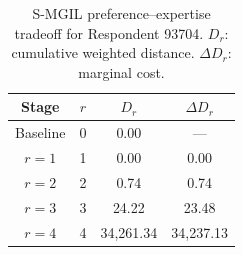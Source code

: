 \begin{table}[htbp]
\centering
\caption{S-MGIL preference--expertise tradeoff for Respondent 93704. $D_r$: cumulative weighted distance. $\Delta D_r$: marginal cost.}
\label{tab:tradeoff}
\footnotesize
\begin{tabular}{cccc}
\toprule
Stage & $r$ & $D_r$ & $\Delta D_r$ \\
\midrule
Baseline & 0 & 0.00 & --- \\
$r=1$ & 1 & 0.00 & 0.00 \\
$r=2$ & 2 & 0.74 & 0.74 \\
$r=3$ & 3 & 24.22 & 23.48 \\
$r=4$ & 4 & 34,261.34 & 34,237.13 \\
\bottomrule
\end{tabular}
\end{table}